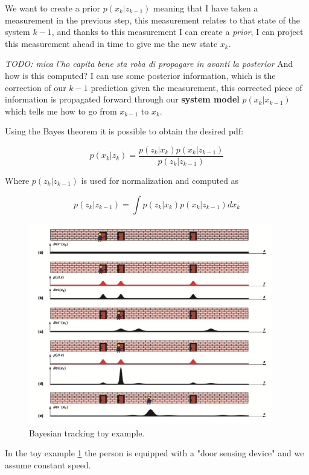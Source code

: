 We want to create a prior $p(x_k|z_{k-1})$ meaning that I have taken a measurement in the previous step, this measurement relates to that state of the system $k-1$, and thanks to this measurement I can create a \textit{prior}, I can project this measurement ahead in time to give me the new state $x_k$.

\textit{TODO: mica l'ho capita bene sta roba di propagare in avanti la posterior}
And how is this computed? I can use some posterior information, which is the correction of our $k-1$ prediction given the measurement, this corrected piece of information is propagated forward through our \textbf{system model} $p(x_k|x_{k-1})$ which tells me how to go from $x_{k-1}$ to $x_k$. 

Using the Bayes theorem it is possible to obtain the desired pdf:

\[
    p(x_k|z_k) = \frac{p(z_k|x_k)p(x_k|z_{k-1})}{p(z_k|z_{k-1})}
\]

Where $p(z_k|z_{k-1})$ is used for normalization and computed as

\[
    p(z_k|z_{k-1}) = \int p(z_k|x_k)p(x_k|z_{k-1})dx_k
\]

\begin{figure}[H]
    \centering
    \includegraphics[width=0.95\textwidth]{Figures/bayes.png}
    \caption{Bayesian tracking toy example.}
    \label{img:bayes}
\end{figure}

In the toy example \ref{img:bayes} the person is equipped with a "door sensing device" and we assume constant speed. 


